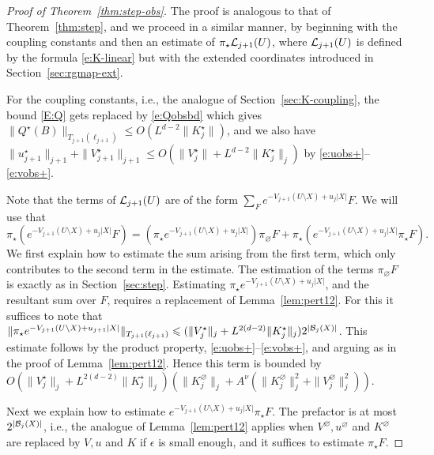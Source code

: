 \documentclass[11pt]{amsart}
\numberwithin{equation}{section}
\numberwithin{theorem}{section}
\newcommand{\1}{{\bf 1}}
\newcommand{\obs}{\star}
\newcommand{\Vbulk}{V^\varnothing}
\newcommand{\Vobs}{V^\obs}
\newcommand{\Kbulk}{K^\varnothing}
\newcommand{\Kobs}{K^\obs}
\begin{document}
\begin{proof}[Proof of Theorem~\ref{thm:step-obs}]
  The proof is analogous to that of Theorem~\ref{thm:step}, and we
  proceed in a similar manner, by beginning with the coupling constants and then
  an estimate of
  $\pi_{\obs}\cL_{j+1}(U)$, where $\mathcal L_{j+1}(U)$ is defined by the formula
  \eqref{e:K-linear} but with the extended coordinates introduced in
  Section~\ref{sec:rgmap-ext}.

  For the coupling constants, i.e., the analogue of Section~\ref{sec:K-coupling}, 
  the bound \eqref{E:Q} gets replaced by
  \eqref{e:Qobsbd} which gives
  $\|Q^{\obs}(B)\|_{T_{j+1}(\ell_{j+1})}\leq O(L^{d-2}\|\Kobs_j\|)$,  and
  we also have
  $\|u_{j+1}^{\obs}\|_{j+1}+\|\Vobs_{j+1}\|_{j+1}\leq
  O(\|\Vobs_j\|+L^{d-2}\|K^{\obs}_j\|_j)$ by
  \eqref{e:uobs+}--\eqref{e:vobs+}.

  Note that the terms of $\mathcal L_{j+1}(U)$ are of the form
  $\sum_{F}e^{-V_{j+1}(U\setminus X)+u_{j}|X|}F$. We will use that
  \begin{equation}
    \pi_{\obs}(e^{-V_{j+1}(U\setminus X)+u_{j}|X|}F) =
    (\pi_{\obs}e^{-V_{j+1}(U\setminus X)+u_{j}|X|}) \pi_{\varnothing}F +
    \pi_{\obs}( e^{-V_{j+1}(U\setminus X)+u_{j}|X|}\pi_{\obs}F).
  \end{equation}
  We first explain how to estimate the sum arising from the first
  term, which only contributes to the second term in the
  estimate. The estimation of the terms $\pi_{\varnothing}F$ is
  exactly as in Section~\ref{sec:step}. Estimating
  $\pi_{\obs}e^{-V_{j+1}(U\setminus X)+u_{j}|X|}$, and the resultant
  sum over $F$, requires a replacement of
  Lemma~\ref{lem:pert12}. For this it suffices to note that
  $\| \pi_{\obs}e^{-V_{j+1}(U\setminus
    X)+u_{j+1}|X|}\|_{T_{j+1}(\ell_{j+1})}\leq
  (\|\Vobs_{j}\|_{j}+L^{2(d-2)}\|\Kobs_{j}\|_{j})
  2^{|\cB_{j}(X)|}$. This estimate follows by the product property,
  \eqref{e:uobs+}--\eqref{e:vobs+}, and arguing as in the proof of
  Lemma~\ref{lem:pert12}. Hence this term is bounded by
  $O(\|\Vobs_{j}\|_{j}+L^{2(d-2)}\|\Kobs_{j}\|_{j})(\|\Kbulk_{j}\|_{j} +
  A^{\nu}(\|\Kbulk_{j}\|^{2}_{j}+\|\Vbulk_{j}\|^{2}_{j}))$. 
  
  Next we explain how to estimate
  $e^{-V_{j+1}(U\setminus X)+u_{j}|X|}\pi_{\obs}F$. The prefactor is
  at most $2^{|\mathcal B_{j}(X)|}$, i.e., the analogue of
  Lemma~\ref{lem:pert12} applies when $\Vbulk, u^{\varnothing}$ and $\Kbulk$ are
  replaced by $V, u$ and $K$ if $\epsilon$ is small enough, and it suffices to estimate $\pi_\obs F$.
  

\end{proof}
\end{document}

